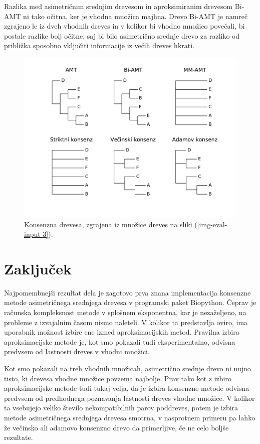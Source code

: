 \documentclass[a4paper, 12pt]{book}
\begin{document}
Razlika med asimetričnim srednjim drevesom in aproksimiranim drevesom Bi-AMT ni tako očitna, ker je vhodna množica majhna. Drevo Bi-AMT je namreč zgrajeno le iz dveh vhodnih dreves in v kolikor bi vhodno množico povečali, bi postale razlike bolj očitne, saj bi bilo asimetrično srednje drevo za razliko od približka sposobno vključiti informacije iz večih dreves hkrati.

\begin{figure}
	\begin{center}
		\includegraphics[scale=0.6, clip=true, trim=1.5cm 1.5cm 1cm 0.8cm]{gfx/eval_gfx_3.pdf}
	\end{center}
	\caption{Konsenzna drevesa, zgrajena iz množice dreves na sliki (\ref{img-eval-input-3}).}
	\label{img-eval-result-3}
\end{figure}

\chapter{Zaključek}
Najpomembnejši rezultat dela je zagotovo prva znana implementacija konsenzne metode asimetričnega srednjega drevesa v programski paket Biopython. Čeprav je računska kompleksnost metode v splošnem eksponentna, kar je nezaželjeno, na probleme z izvajalnim časom nismo naleteli. V kolikor ta predstavlja oviro, ima uporabnik možnost izbire ene izmed aproksimacijskih metod. Pravilna izbira aproksimacijske metode je, kot smo pokazali tudi eksperimentalno, odvisna predvsem od lastnosti dreves v vhodni množici. 

Kot smo pokazali na treh vhodnih množicah, asimetrično srednje drevo ni nujno tisto, ki drevesa vhodne množice povzema najbolje. Prav tako kot z izbiro aproksimacijske metode tudi tukaj velja, da je izbira konsenzne metode odvisna predvsem od predhodnega poznavanja lastnosti dreves vhodne množice. V kolikor ta vsebujejo veliko število nekompatibilnih parov poddreves, potem je izbira metode asimetričnega srednjega drevesa smotrna, v nasprotnem primeru pa lahko že večinsko ali adamovo konsenzno drevo da primerljive, če ne celo boljše rezultate.
\end{document}

